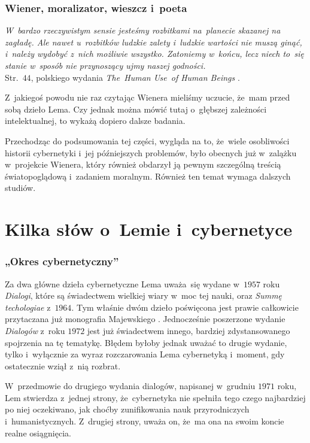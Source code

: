 \documentclass[10pt,t]{beamer}
\begin{document}
\begin{frame}
  \frametitle{Wiener, moralizator, wieszcz i~poeta}


  \textit{W~bardzo rzeczywistym sensie jesteśmy rozbitkami na~planecie
    skazanej na zagładę. Ale nawet u~rozbitków ludzkie zalety i~ludzkie
    wartości nie muszą ginąć, i~należy wydobyć z~nich możliwie wszystko.
    Zatoniemy w~końcu, lecz niech to~się stanie w~sposób nie przynoszący
    ujmy naszej godności.} \\
  Str.~$44$, polskiego wydania \textit{The~Human Use~of Human Beings}
  \parencite{Wiener-Cybernetyka-a-spoleczenstwo-Pub-2016}.

  Z~jakiegoś powodu nie raz czytając Wienera mieliśmy uczucie, że~mam
  przed sobą dzieło Lema. Czy jednak można mówić tutaj o~głębszej
  zależności intelektualnej, to wykażą dopiero dalsze badania.

  Przechodząc do podsumowania tej części, wygląda na to, że~wiele
  osobliwości historii cybernetyki i~jej późniejszych problemów, było
  obecnych już w~zalążku w~projekcie Wienera, który również obdarzył ją
  pewnym szczególną treścią światopoglądową i~zadaniem moralnym. Również
  ten temat wymaga dalszych studiów.

\end{frame}










\section{Kilka słów o~Lemie i~cybernetyce}


\begin{frame}
  \frametitle{„Okres cybernetyczny”}


  Za dwa główne dzieła cybernetyczne Lema uważa~się wydane w~$1957$ roku
  \textit{Dialogi}, które są świadectwem wielkiej wiary w~moc tej nauki,
  oraz \textit{Summę techologiae} z~$1964$. Tym właśnie dwóm dzieło
  poświęcona jest prawie całkowicie przytaczana już monografia
  Majewskiego
  \parencite{Majewski-Miedzy-zwierzeciem-a-maszyna-ETC-Pub-2007}.
  Jednocześnie poszerzone wydanie \textit{Dialogów} z~roku $1972$ jest już
  świadectwem innego, bardziej zdystansowanego spojrzenia na tę tematykę.
  Błędem byłoby jednak uważać to drugie wydanie, tylko i~wyłącznie za wyraz
  rozczarowania Lema cybernetyką i~moment, gdy ostatecznie wziął z~nią
  rozbrat.

  W~przedmowie do drugiego wydania dialogów, napisanej w~grudniu
  $1971$ roku, Lem stwierdza z~jednej strony, że~cybernetyka nie spełniła
  tego czego najbardziej po niej oczekiwano, jak choćby zunifikowania
  nauk przyrodniczych i~humanistycznych. Z~drugiej strony, uważa on,
  że~ma ona na swoim koncie realne osiągnięcia.

\end{frame}
\end{document}
